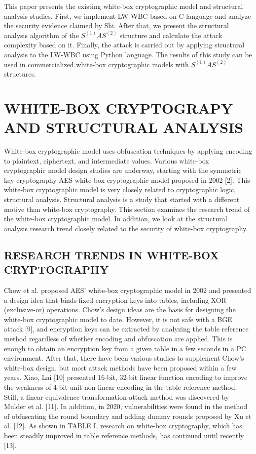 \documentclass{ieeeaccess}
\begin{document}
This paper presents the existing white-box cryptographic model and structural analysis studies. First, we implement LW-WBC based on C language and analyze the security evidence claimed by Shi. After that, we present the structural analysis algorithm of the $S^{(1)} AS^{(2)}$ structure and calculate the attack complexity based on it. Finally, the attack is carried out by applying structural analysis to the LW-WBC using Python language. The results of this study can be used in commercialized white-box cryptographic models with $S^{(1)} AS^{(2)}$ structures. 

\section{WHITE-BOX CRYPTOGRAPY AND STRUCTURAL ANALYSIS}
White-box cryptographic model uses obfuscation techniques by applying encoding to plaintext, ciphertext, and intermediate values. Various white-box cryptographic model design studies are underway, starting with the symmetric key cryptography AES white-box cryptographic model proposed in 2002 [2]. This white-box cryptographic model is very closely related to cryptographic logic, structural analysis. Structural analysis is a study that started with a different motive than white-box cryptography. 
This section examines the research trend of the white-box cryptographic model. In addition, we look at the structural analysis research trend closely related to the security of white-box cryptography. 
 
 \subsection{RESEARCH TRENDS IN WHITE-BOX CRYPTOGRAPHY}
 Chow et al. proposed AES’ white-box cryptographic model in 2002 and presented a design idea that binds fixed encryption keys into tables, including XOR (exclusive-or) operations. Chow's design ideas are the basis for designing the white-box cryptographic model to date. However, it is not safe with a BGE attack [9], and encryption keys can be extracted by analyzing the table reference method regardless of whether encoding and obfuscation are applied. This is enough to obtain an encryption key from a given table in a few seconds in a PC environment. 
After that, there have been various studies to supplement Chow's white-box design, but most attack methods have been proposed within a few years. Xiao, Lai [10] presented 16-bit, 32-bit linear function encoding to improve the weakness of 4-bit unit non-linear encoding in the table reference method. Still, a linear equivalence transformation attack method was discovered by Mulder et al. [11]. In addition, in 2020, vulnerabilities were found in the method of obfuscating the round boundary and adding dummy rounds proposed by Xu et al. [12]. As shown in TABLE I, research on white-box cryptography, which has been steadily improved in table reference methods, has continued until recently [13]. 
\end{document}

